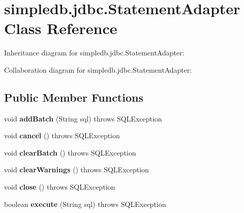 \hypertarget{classsimpledb_1_1jdbc_1_1StatementAdapter}{}\section{simpledb.\+jdbc.\+Statement\+Adapter Class Reference}
\label{classsimpledb_1_1jdbc_1_1StatementAdapter}


Inheritance diagram for simpledb.\+jdbc.\+Statement\+Adapter\+:


Collaboration diagram for simpledb.\+jdbc.\+Statement\+Adapter\+:
\subsection*{Public Member Functions}
\begin{DoxyCompactItemize}
\item 
\mbox{\label{classsimpledb_1_1jdbc_1_1StatementAdapter_a43c0eefdf1e9a9b77b6f40c547c99746}} 
void {\bfseries add\+Batch} (String sql)  throws S\+Q\+L\+Exception 
\item 
\mbox{\label{classsimpledb_1_1jdbc_1_1StatementAdapter_a5378d6cd228327b87942ad24731398a6}} 
void {\bfseries cancel} ()  throws S\+Q\+L\+Exception 
\item 
\mbox{\label{classsimpledb_1_1jdbc_1_1StatementAdapter_a5c409c23c15289ae36c612077f76d603}} 
void {\bfseries clear\+Batch} ()  throws S\+Q\+L\+Exception 
\item 
\mbox{\label{classsimpledb_1_1jdbc_1_1StatementAdapter_a8e4a52d46c4a9c7b04e602058461d6b0}} 
void {\bfseries clear\+Warnings} ()  throws S\+Q\+L\+Exception 
\item 
\mbox{\label{classsimpledb_1_1jdbc_1_1StatementAdapter_a4941a8ee5b07630725665cff8d22df29}} 
void {\bfseries close} ()  throws S\+Q\+L\+Exception 
\item 
\mbox{\label{classsimpledb_1_1jdbc_1_1StatementAdapter_a42c891eda9dbcae2c87ffcccbc821668}} 
boolean {\bfseries execute} (String sql)  throws S\+Q\+L\+Exception 

\end{DoxyCompactItemize}
